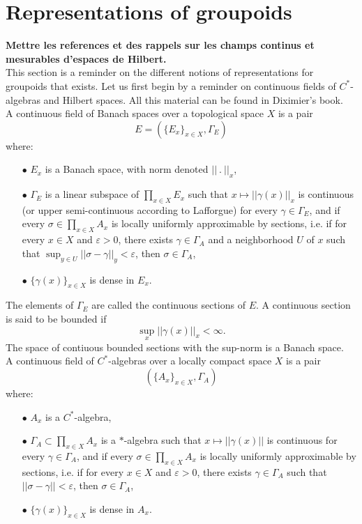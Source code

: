 \section{Representations of groupoids}

\textbf{Mettre les references et des rappels sur les champs continus et mesurables d'espaces de Hilbert.}\\

This section is a reminder on the different notions of representations for groupoids that exists. Let us first begin by a reminder on continuous fields of $C^*$-algebras and Hilbert spaces. All this material can be found in Diximier's book\cite{dixmier}.\\

A continuous field of Banach spaces over a topological space $X$ is a pair 
\[ E= \left( \{ E_x \}_{x\in X} , \Gamma_E \right) \]
where:\\
\begin{itemize}
\item[$\bullet$] $E_x$ is a Banach space, with norm denoted $||\ .\ ||_x$,\\
\item[$\bullet$] $\Gamma_E $ is a linear subspace of $\prod_{x\in X} E_x$ such that $x\mapsto || \gamma (x) ||_x$ is continuous (or upper semi-continuous according to Lafforgue) for every $\gamma \in \Gamma_E$, and if every $\sigma \in \prod_{x\in X} A_x$ is locally uniformly approximable by sections, i.e. if for every $x\in X$ and $\varepsilon >0$, there exists $\gamma\in\Gamma_A$ and a neighborhood $U$ of $x$ such that $\sup_{y\in U}||\sigma-\gamma||_y<\varepsilon$,
then $\sigma\in\Gamma_A$,\\
\item[$\bullet$] $\{ \gamma(x)\}_{x\in X}$ is dense in $E_x$.\\
\end{itemize}
The elements of $\Gamma_E$ are called the continuous sections of $E$. A continuous section is said to be bounded if 
\[\sup_x ||\gamma(x)||_x< \infty.\] 
The space of contiuous bounded sections with the sup-norm is a Banach space.\\ 

A continuous field of $C^*$-algebras over a locally compact space $X$ is a pair 
\[ \left( \{ A_x \}_{x\in X} , \Gamma_A \right) \]
where:\\
\begin{itemize}
\item[$\bullet$] $A_x$ is a $C^*$-algebra,\\
\item[$\bullet$] $\Gamma_A \subset \prod_{x\in X} A_x$ is a $*$-algebra such that $x\mapsto || \gamma (x) ||$ is continuous for every $\gamma \in \Gamma_A$, and if every $\sigma \in \prod_{x\in X} A_x$ is locally uniformly approximable by sections, i.e. if for every $x\in X$ and $\varepsilon >0$, there exists $\gamma\in\Gamma_A$ such that $||\sigma-\gamma||<\varepsilon$,
then $\sigma\in\Gamma_A$,\\
\item[$\bullet$] $\{ \gamma(x)\}_{x\in X}$ is dense in $A_x$.\\
\end{itemize}


